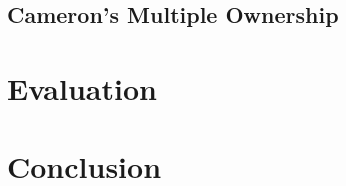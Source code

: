 \documentclass{acm_proc_article-sp}
\begin{document}
\lipsum[9]

\subsection{Cameron's Multiple Ownership}
\label{subsec:cameron}

%
%
%

\lipsum[10]



\section{Evaluation}
\label{sec:eval}

\lipsum[11]




\section{Conclusion}
\label{sec:conclude}





\lipsum[12]
\end{document}
